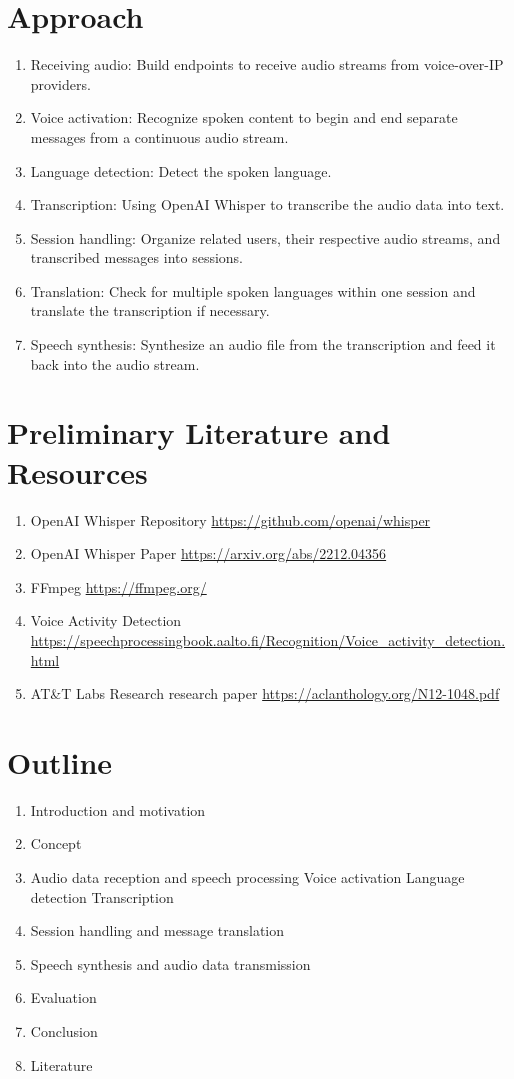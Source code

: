 \documentclass[a4paper,10pt]{report}
\begin{document}
\section{Approach}
\begin{enumerate}
  \item Receiving audio: Build endpoints to receive audio streams from voice-over-IP providers.
  \item Voice activation: Recognize spoken content to begin and end separate messages from a continuous audio stream.
  \item Language detection: Detect the spoken language.
  \item Transcription: Using OpenAI Whisper to transcribe the audio data into text.
  \item Session handling: Organize related users, their respective audio streams, and transcribed messages into sessions.
  \item Translation: Check for multiple spoken languages within one session and translate the transcription if necessary.
  \item Speech synthesis: Synthesize an audio file from the transcription and feed it back into the audio stream.
\end{enumerate}


\section{Preliminary Literature and Resources}
\begin{enumerate}
  \item OpenAI Whisper Repository \url{https://github.com/openai/whisper}
  \item OpenAI Whisper Paper \url{https://arxiv.org/abs/2212.04356}
  \item FFmpeg \url{https://ffmpeg.org/}
  \item Voice Activity Detection \url{https://speechprocessingbook.aalto.fi/Recognition/Voice_activity_detection.html}
  \item AT\&T Labs Research research paper \url{https://aclanthology.org/N12-1048.pdf}
\end{enumerate}


\section{Outline}
\begin{enumerate}
  \item Introduction and motivation
  \item Concept
  \item Audio data reception and speech processing
  \subitem Voice activation
  \subitem Language detection
  \subitem Transcription
  \item Session handling and message translation
  \item Speech synthesis and audio data transmission
  \item Evaluation
  \item Conclusion
  \item Literature
\end{enumerate}
\end{document}
